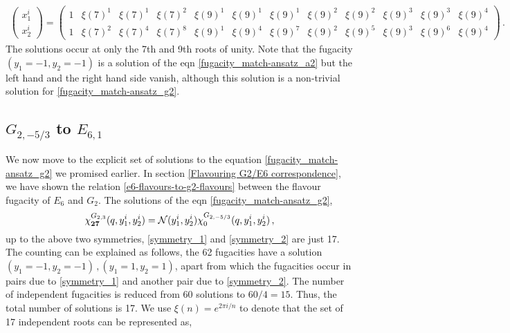 \documentclass[a4paper,12pt]{article}
\begin{document}
\begin{align}\label{dep_a2_flavour_fugacities}
    \begin{pmatrix}
        x_1^i\\
        x_2^i
    \end{pmatrix}=
    \left(
    \begin{array}{cccccccccccc}
        1 & \xi(7)^1 & \xi(7)^1 & \xi(7)^2 & \xi(9)^1 & \xi(9)^1 & \xi(9)^1 & \xi(9)^2 & \xi(9)^2 & \xi(9)^3 & \xi(9)^3 & \xi(9)^4 \\
        1 & \xi(7)^2 & \xi(7)^4 & \xi(7)^8 & \xi(9)^1 & \xi(9)^4 & \xi(9)^7 & \xi(9)^2 & \xi(9)^5 & \xi(9)^3 & \xi(9)^6 & \xi(9)^4
     \end{array}
     \right)\, .
\end{align}
The solutions occur at only the 7th and 9th roots of unity. Note that the fugacity $(y_1=-1,y_2=-1)$ is a solution of the eqn \eqref{fugacity_match-ansatz_a2} but the left hand and the right hand side vanish, although this solution is a non-trivial solution for \eqref{fugacity_match-ansatz_g2}.

\subsection{\ensuremath{G_{2,-5/3}} to \ensuremath{E_{6,1}}}\label{explicit_fug_g2}
We now move to the explicit set of solutions to the equation \eqref{fugacity_match-ansatz_g2} we promised earlier. In section \ref{Flavouring G2/E6 correspondence}, we have shown the relation \eqref{e6-flavours-to-g2-flavours} between the flavour fugacity of $E_6$ and $G_2$. The solutions of the eqn \eqref{fugacity_match-ansatz_g2},
\begin{equation}\label{fugacity_match-ansatz_g2sol}
        \chi^{G_{2,3}}_{\bf 27}(q,y_1^i,y_2^i)=\mathcal{N}(y_1^i,y_2^i)\chi^{G_{2,-5/3}}_{0}(q,y_1^i,y_2^i)\, ,
    \end{equation}
up to the above two symmetries, \eqref{symmetry_1} and \eqref{symmetry_2} are just 17. The counting can be explained as follows, the 62 fugacities have a solution $(y_1=-1,y_2=-1)\, ,(y_1=1,y_2=1)$, apart from which the fugacities occur in pairs due to \eqref{symmetry_1} and another pair due to \eqref{symmetry_2}. The number of independent fugacities is reduced from 60 solutions to $60/4=15$. Thus, the total number of solutions is 17. We use $\xi(n)=e^{2\pi i/n}$ to denote that the set of 17 independent roots can be represented as,
\end{document}
